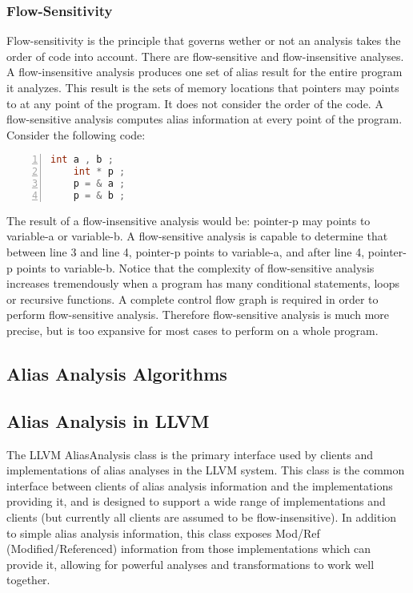 \subsubsection{Flow-Sensitivity}


Flow-sensitivity is the principle that governs wether or not an analysis takes the order of code
into account. There are flow-sensitive and flow-insensitive analyses.
A flow-insensitive analysis produces one set of alias result for the entire program it analyzes.
This result is the sets of memory locations that pointers may points to at any point of the program.
It does not consider the order of the code. A flow-sensitive analysis computes alias information
at every point of the program. Consider the following code:



\begin{lstlisting}[language=C,numbers=left,
    numberstyle=\small\color{gray}]
    int a , b ;
    int * p ;
    p = & a ;
    p = & b ;
\end{lstlisting}



The result of a flow-insensitive analysis would be: pointer-p may points to variable-a or
variable-b. A flow-sensitive analysis is capable to determine that between line 3 and line 4,
pointer-p points to variable-a, and after line 4, pointer-p points to variable-b.
Notice that the complexity of flow-sensitive analysis increases tremendously when a program
has many conditional statements, loops or recursive functions. A complete control flow graph
is required in order to perform flow-sensitive analysis. Therefore flow-sensitive analysis is much
more precise, but is too expansive for most cases to perform on a whole program.




\subsection{Alias Analysis Algorithms}







\subsection{Alias Analysis in LLVM}



The LLVM AliasAnalysis class  is the primary interface used by clients and implementations
of alias analyses in the LLVM system. This class is the common interface between clients of alias
analysis information and the implementations providing it, and is designed to support a wide range
of implementations and clients (but currently all clients are assumed to be flow-insensitive). In
addition to simple alias analysis information, this class exposes Mod/Ref (Modified/Referenced)
information from those implementations which can provide it, allowing for powerful analyses and
transformations to work well together.

